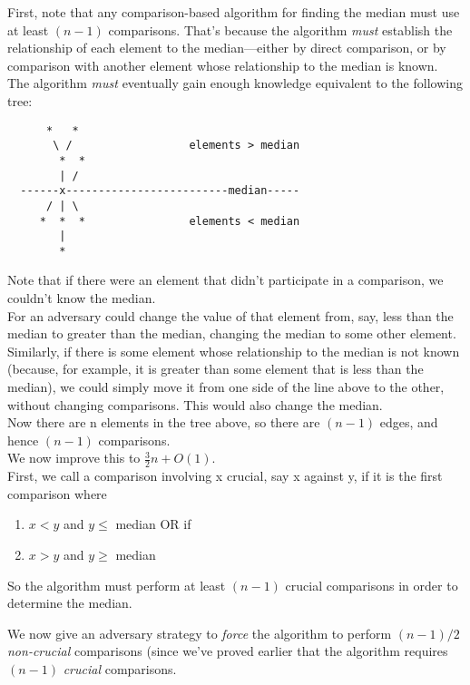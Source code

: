 \documentclass[12pt]{article}
\theoremstyle{plain}
\theoremstyle{definition}
\newcommand{\lecture}[1]{\marginpar{{\footnotesize $\leftarrow$ \underline{#1}}}}
\begin{document}
First, note that any comparison-based algorithm for finding the median must use at least $(n - 1)$ comparisons.
That's because the algorithm \emph{must} establish the relationship of each element to the median---either by direct comparison, or by comparison with another element whose relationship to the median is known. \\
The algorithm \emph{must} eventually gain enough knowledge equivalent to the following tree:
\begin{verbatim}
      *   *
       \ /                  elements > median
        *  *
        | /
  ------x-------------------------median-----
      / | \
     *  *  *                elements < median
        |
        *
\end{verbatim}

Note that if there were an element that didn't participate in a comparison, we couldn't know the median. \\
For an adversary could change the value of that element from, say, less than the median to greater than the median, changing the median to some other element. \\
Similarly, if there is some element whose relationship to the median is not known (because, for example, it is greater than some element that is less than the median), we could simply move it from one side of the line above to the other, without changing comparisons.
This would also change the median. \\

Now there are n elements in the tree above, so there are $(n - 1)$ edges, and hence $(n - 1)$ comparisons. \\
We now improve this to $\frac{3}{2}n + O(1)$. \\
First, we call a comparison involving x crucial, say x against y, if it is the first comparison where
\begin{enumerate}
  \item $x < y$ and $y \leq$ median OR if
  \item $x > y$ and $y \geq$ median
\end{enumerate}
So the algorithm must perform at least $(n - 1)$ crucial comparisons in order to determine the median. \\

\lecture{November 1, 2016}

We now give an adversary strategy to \emph{force} the algorithm to perform $(n - 1)/2$ \emph{non-crucial} comparisons (since we've proved earlier that the algorithm requires $(n - 1)$ \emph{crucial} comparisons. \\
\end{document}
